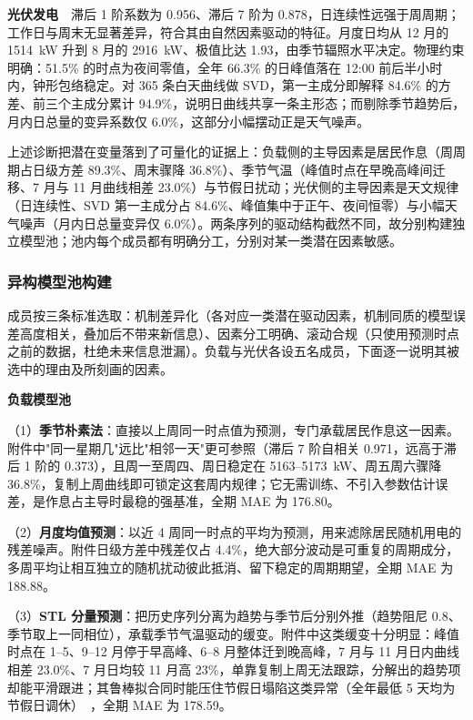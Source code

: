 \textbf{光伏发电}\ \ 滞后 1 阶系数为 0.956、滞后 7 阶为 0.878，日连续性远强于周周期；工作日与周末无显著差异，符合其由自然因素驱动的特征。月度日均从 12 月的 1514~kW 升到 8 月的 2916~kW、极值比达 1.93，由季节辐照水平决定。物理约束明确：51.5\% 的时点为夜间零值，全年 66.3\% 的日峰值落在 12:00 前后半小时内，钟形包络稳定。对 365 条白天曲线做 SVD，第一主成分即解释 84.6\% 的方差、前三个主成分累计 94.9\%，说明日曲线共享一条主形态；而剔除季节趋势后，月内日总量的变异系数仅 6.0\%，这部分小幅摆动正是天气噪声。

上述诊断把潜在变量落到了可量化的证据上：负载侧的主导因素是居民作息（周周期占日级方差 89.3\%、周末骤降 36.8\%）、季节气温（峰值时点在早晚高峰间迁移、7 月与 11 月曲线相差 23.0\%）与节假日扰动；光伏侧的主导因素是天文规律（日连续性、SVD 第一主成分占 84.6\%、峰值集中于正午、夜间恒零）与小幅天气噪声（月内日总量变异仅 6.0\%）。两条序列的驱动结构截然不同，故分别构建独立模型池；池内每个成员都有明确分工，分别对某一类潜在因素敏感。

\subsubsection{异构模型池构建}

成员按三条标准选取：机制差异化（各对应一类潜在驱动因素，机制同质的模型误差高度相关，叠加后不带来新信息）、因素分工明确、滚动合规（只使用预测时点之前的数据，杜绝未来信息泄漏）。负载与光伏各设五名成员，下面逐一说明其被选中的理由及所刻画的因素。

\textbf{负载模型池}

（1）\textbf{季节朴素法}：直接以上周同一时点值为预测，专门承载居民作息这一因素。附件中"同一星期几"远比"相邻一天"更可参照（滞后 7 阶自相关 0.971，远高于滞后 1 阶的 0.373），且周一至周四、周日稳定在 5163--5173~kW、周五周六骤降 36.8\%，复制上周曲线即可锁定这套周内规律；它无需训练、不引入参数估计误差，是作息占主导时最稳的强基准，全期 MAE 为 176.80。

（2）\textbf{月度均值预测}：以近 4 周同一时点的平均为预测，用来滤除居民随机用电的残差噪声。附件日级方差中残差仅占 4.4\%，绝大部分波动是可重复的周期成分，多周平均让相互独立的随机扰动彼此抵消、留下稳定的周期期望，全期 MAE 为 188.88。

（3）\textbf{STL 分量预测}：把历史序列分离为趋势与季节后分别外推（趋势阻尼 0.8、季节取上一同相位），承载季节气温驱动的缓变。附件中这类缓变十分明显：峰值时点在 1--5、9--12 月停于早高峰、6--8 月整体迁到晚高峰，7 月与 11 月日内曲线相差 23.0\%、7 月日均较 11 月高 23\%，单靠复制上周无法跟踪，分解出的趋势项却能平滑跟进；其鲁棒拟合同时能压住节假日塌陷这类异常（全年最低 5 天均为节假日调休）~\cite{cleveland1990}，全期 MAE 为 178.59。

